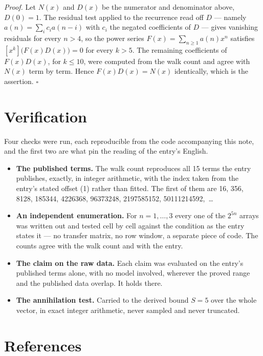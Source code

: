 \documentclass[11pt]{article}
\theoremstyle{definition}
\begin{document}
{\itshape Proof.} Let $N(x)$ and $D(x)$ be the numerator and denominator above, $D(0)=1$. The residual test applied to the recurrence read off $D$ --- namely $a(n) = \sum_i c_i a(n-i)$ with $c_i$ the negated coefficients of $D$ --- gives vanishing residuals for every $n > 4$, so the power series $F(x)=\sum_{n\ge 1}a(n)x^n$ satisfies $[x^k]\bigl(F(x)D(x)\bigr) = 0$ for every $k > 5$. The remaining coefficients of $F(x)D(x)$, for $k \le 10$, were computed from the walk count and agree with $N(x)$ term by term. Hence $F(x)D(x) = N(x)$ identically, which is the assertion. $\square$

\section{Verification}

Four checks were run, each reproducible from the code accompanying this note, and the first two are what pin the reading of the entry's English.

\begin{itemize}

\item {\bfseries The published terms.} The walk count reproduces all 15 terms the entry publishes, exactly, in integer arithmetic, with the index taken from the entry's stated offset (1) rather than fitted. The first of them are 16, 356, 8128, 185344, 4226368, 96373248, 2197585152, 50111214592,~\dots

\item {\bfseries An independent enumeration.} For $n = 1,\dots,3$ every one of the $2^{5n}$ arrays was written out and tested cell by cell against the condition as the entry states it --- no transfer matrix, no row window, a separate piece of code. The counts agree with the walk count and with the entry.

\item {\bfseries The claim on the raw data.} Each claim was evaluated on the entry's published terms alone, with no model involved, wherever the proved range and the published data overlap. It holds there.

\item {\bfseries The annihilation test.} Carried to the derived bound $S = 5$ over the whole vector, in exact integer arithmetic, never sampled and never truncated.

\end{itemize}

\section{References}
\end{document}
